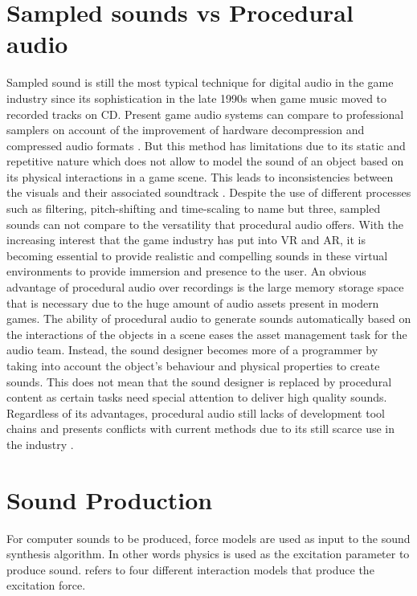 \section{Sampled sounds vs Procedural audio}

Sampled sound is still the most typical technique for digital audio in the game industry since its sophistication in the late 1990s when game music moved to recorded tracks on CD. Present game audio systems can compare to professional samplers on account of the improvement of hardware decompression and compressed audio formats \cite{farnell2007introduction}. But this method has limitations due to its static and repetitive nature which does not allow to model the sound of an object based on its physical interactions in a game scene. This leads to inconsistencies between the visuals and their associated soundtrack \cite{picard2009expressive}. Despite the use of different processes such as filtering, pitch-shifting and time-scaling to name but three, sampled sounds can not compare to the versatility that procedural audio offers. With the increasing interest that the game industry has put into \gls{VR} and \gls{AR}, it is becoming essential to provide realistic and compelling sounds in these virtual environments to provide immersion and presence to the user. An obvious advantage of procedural audio over recordings is the large memory storage space that is necessary due to the huge amount of audio assets present in modern games. The ability of procedural audio to generate sounds automatically based on the interactions of the objects in a scene eases the asset management task for the audio team. Instead, the sound designer becomes more of a programmer by taking into account the object’s behaviour and physical properties to create sounds. This does not mean that the sound designer is replaced by procedural content as certain tasks need special attention to deliver high quality sounds. Regardless of its advantages, procedural audio still lacks of development tool chains and presents conflicts with current methods due to its still scarce use in the industry \cite{farnell2010designing}.

\section{Sound Production}

For computer sounds to be produced, force models are used as input to the sound synthesis algorithm. In other words physics is used as the excitation parameter to produce sound. \cite{van2003modal} refers to four different interaction models that produce the excitation force.

